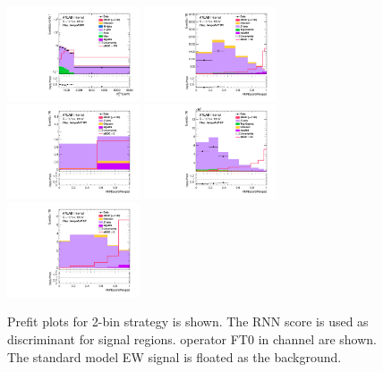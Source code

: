 \begin{figure}[ht]
    \centering
    	\includegraphics[width=0.35\textwidth]{figures/aQGC/Region_distMTagMerJets_DCRVjet_BMin0_J0_incJet1_L2_T0_incFat1_Y6051_incTag1_Fat1_Prefitlog.pdf}
    	\includegraphics[width=0.35\textwidth]{figures/aQGC/Region_distRNNScoreMerged_DSRVBSHPLMVV_BMin0_J0_incJet1_L2_T0_incFat1_Y6051_incTag1_Fat1_Prefit.pdf}
    	\includegraphics[width=0.35\textwidth]{figures/aQGC/Region_distRNNScoreMerged_DSRVBSHPHMVV_BMin0_J0_incJet1_L2_T0_incFat1_Y6051_incTag1_Fat1_Prefit.pdf}
    	\includegraphics[width=0.35\textwidth]{figures/aQGC/Region_distRNNScoreMerged_DSRVBSLPLMVV_BMin0_J0_incJet1_L2_T0_incFat1_Y6051_incTag1_Fat1_Prefit.pdf}
    	\includegraphics[width=0.35\textwidth]{figures/aQGC/Region_distRNNScoreMerged_DSRVBSLPHMVV_BMin0_J0_incJet1_L2_T0_incFat1_Y6051_incTag1_Fat1_Prefit.pdf}
        \caption{Prefit plots for 2-bin strategy is shown. The RNN score is used as discriminant for signal regions. operator FT0 in \tlep channel are shown. The standard model EW signal is floated as the background.}
        \label{fig:2lepTwoBin}
\end{figure}

